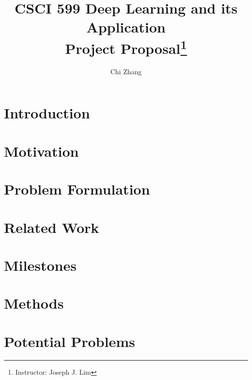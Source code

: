 \documentclass[a4paper, 11pt]{article}
\title{CSCI 599 Deep Learning and its Application\\Project Proposal\thanks{Instructor: Joseph J. Lim}}
\author[1]{Chi Zhang}
\affil[1]{Department of Computer Science}
\begin{document}
  \maketitle                     %
  \begin{spacing}{1.5}
    
    \section{Introduction}
    
    
    \section{Motivation}
    
    \section{Problem Formulation}
    
    \section{Related Work}
    
    \section{Milestones}
    
    \section{Methods}
    
    \section{Potential Problems} 
  
  \end{spacing}  
  
  
\end{document}
